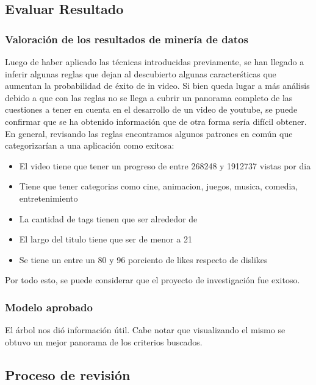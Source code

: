 \subsection{Evaluar Resultado}
    \subsubsection{Valoración de los resultados de minería de datos}

        Luego de haber aplicado las técnicas introducidas previamente, se han
        llegado a inferir algunas reglas que dejan al descubierto algunas
        caracterśticas que aumentan la probabilidad de éxito de in video.
        Si bien queda lugar a más análisis debido a que con las reglas no se
        llega a cubrir un panorama completo de las cuestiones a tener en cuenta
        en el desarrollo de un video de youtube, se puede confirmar que se ha
        obtenido información que de otra forma sería difícil obtener.\\
        En general, revisando las reglas encontramos algunos patrones en común
        que categorizarían a una aplicación como exitosa:
        \begin{itemize}
            \item El video tiene que tener un progreso de entre 268248 y 1912737 vistas por dia
            \item Tiene que tener categorias como cine, animacion, juegos, musica, comedia, entretenimiento
            \item La cantidad de tags tienen que ser alrededor de
            \item El largo del titulo tiene que ser de menor a 21
            \item Se tiene un entre un 80 y 96 porciento de likes respecto de dislikes
        \end{itemize}
        Por todo esto, se puede considerar que el proyecto de investigación fue
        exitoso.
    \subsubsection{Modelo aprobado}

        El árbol nos dió información útil. Cabe notar que visualizando el mismo
        se obtuvo un mejor panorama de los criterios buscados.

\subsection{Proceso de revisión}

